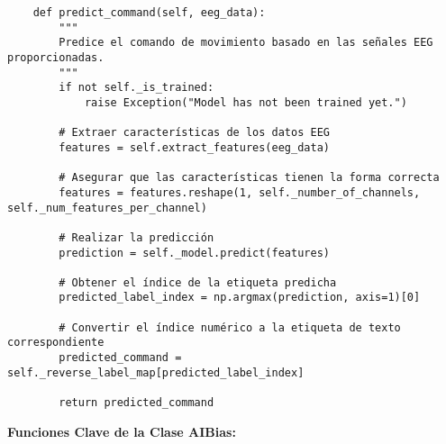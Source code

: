 \documentclass{article}
\begin{document}
\begin{lstlisting}
    def predict_command(self, eeg_data):
        """
        Predice el comando de movimiento basado en las señales EEG proporcionadas.
        """
        if not self._is_trained:
            raise Exception("Model has not been trained yet.")
        
        # Extraer características de los datos EEG
        features = self.extract_features(eeg_data)
        
        # Asegurar que las características tienen la forma correcta
        features = features.reshape(1, self._number_of_channels, self._num_features_per_channel)
        
        # Realizar la predicción
        prediction = self._model.predict(features)
        
        # Obtener el índice de la etiqueta predicha
        predicted_label_index = np.argmax(prediction, axis=1)[0]
        
        # Convertir el índice numérico a la etiqueta de texto correspondiente
        predicted_command = self._reverse_label_map[predicted_label_index]
        
        return predicted_command
\end{lstlisting}
\textbf{Funciones Clave de la Clase AIBias:}
\end{document}
